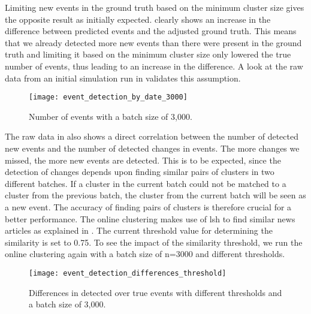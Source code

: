 Limiting new events in the ground truth based on the minimum cluster size
gives the opposite result as initially expected.
 clearly shows
an increase in the difference between predicted events and the adjusted ground truth.
This means that we already detected more new events than there were present in the ground truth
and limiting it based on the minimum cluster size only lowered the true number of events,
thus leading to an increase in the difference.
A look at the raw data from an initial simulation run in 
validates this assumption.

\begin{figure}[h]
    \centering
    \texttt{[image: event\_detection\_by\_date\_3000]}
    \caption{Number of events with a batch size of 3,000.}
    \label{fig:event_detection_by_date_3000}
\end{figure}

The raw data in 
also shows a direct correlation between the number of detected new events and the number of detected changes in events.
The more changes we missed, the more new events are detected.
This is to be expected,
since the detection of changes depends upon finding similar pairs of clusters in two different batches.
If a cluster in the current batch could not be matched to a cluster from the previous batch,
the cluster from the current batch will be seen as a new event.
The accuracy of finding pairs of clusters is therefore crucial for a better performance.
The online clustering makes use of \gls{lsh} to find similar news articles
as explained in .
The current threshold value for determining the similarity is set to 0.75.
To see the impact of the similarity threshold,
we run the online clustering again with a batch size of n=3000 and different thresholds.

\begin{figure}[h]
    \centering
    \texttt{[image: event\_detection\_differences\_threshold]}
    \caption{Differences in detected over true events with different thresholds and a batch size of 3,000.}
    \label{fig:event_detection_differences_threshold}
\end{figure}

